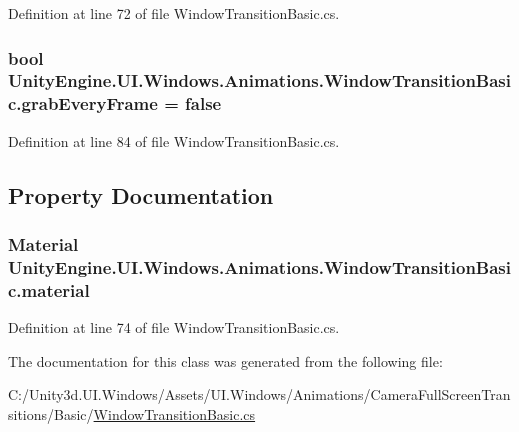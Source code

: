 Definition at line 72 of file Window\+Transition\+Basic.\+cs.

\hypertarget{class_unity_engine_1_1_u_i_1_1_windows_1_1_animations_1_1_window_transition_basic_ac3212a99fe0aa2c7a3568e64ec224347}{}
\subsubsection[{grab\+Every\+Frame}]{\setlength{\rightskip}{0pt plus 5cm}bool Unity\+Engine.\+U\+I.\+Windows.\+Animations.\+Window\+Transition\+Basic.\+grab\+Every\+Frame = false}\label{class_unity_engine_1_1_u_i_1_1_windows_1_1_animations_1_1_window_transition_basic_ac3212a99fe0aa2c7a3568e64ec224347}


Definition at line 84 of file Window\+Transition\+Basic.\+cs.



\subsection{Property Documentation}
\hypertarget{class_unity_engine_1_1_u_i_1_1_windows_1_1_animations_1_1_window_transition_basic_a1e1577f4e66ec7ac3842a672e4b2d0e5}{}
\subsubsection[{material}]{\setlength{\rightskip}{0pt plus 5cm}Material Unity\+Engine.\+U\+I.\+Windows.\+Animations.\+Window\+Transition\+Basic.\+material\hspace{0.3cm}{\ttfamily [get]}}\label{class_unity_engine_1_1_u_i_1_1_windows_1_1_animations_1_1_window_transition_basic_a1e1577f4e66ec7ac3842a672e4b2d0e5}


Definition at line 74 of file Window\+Transition\+Basic.\+cs.



The documentation for this class was generated from the following file\+:\begin{DoxyCompactItemize}
\item 
C\+:/\+Unity3d.\+U\+I.\+Windows/\+Assets/\+U\+I.\+Windows/\+Animations/\+Camera\+Full\+Screen\+Transitions/\+Basic/\hyperlink{_window_transition_basic_8cs}{Window\+Transition\+Basic.\+cs}\end{DoxyCompactItemize}
